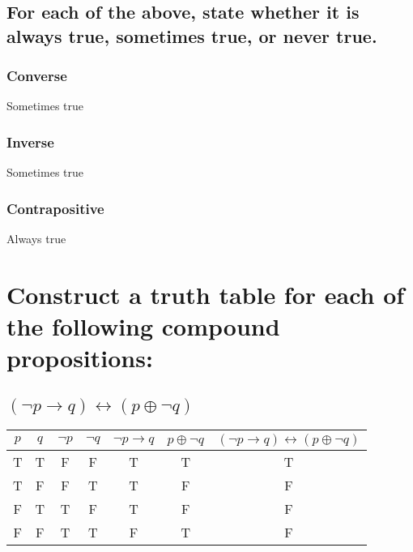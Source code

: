 \documentclass{article}
\begin{document}
    \subsection{For each of the above, state whether it is always true, sometimes true, or never true.} 
        \subsubsection{Converse} Sometimes true
        \subsubsection{Inverse} Sometimes true
        \subsubsection{Contrapositive} Always true

\section{Construct a truth table for each of the following compound propositions:}
    \subsection{\texorpdfstring{$(\neg p \to q) \leftrightarrow (p \oplus \neg q)$}{(¬p → q) ↔ (p ⊕ ¬q)}}
        \begin{center}
            \begin{tabular}{|c|c|c|c|c|c|c|}
                \hline
                $p$ & $q$ & $\neg p$& $\neg q$ & $\neg p \to q$ & $p \oplus \neg q$ & $(\neg p \to q) \leftrightarrow (p \oplus \neg q)$ \\
                \hline
                T & T & F & F & T & T & T \\
                T & F & F & T & T & F & F \\
                F & T & T & F & T & F & F \\
                F & F & T & T & F & T & F \\
                \hline
            \end{tabular}
        \end{center}
\end{document}
